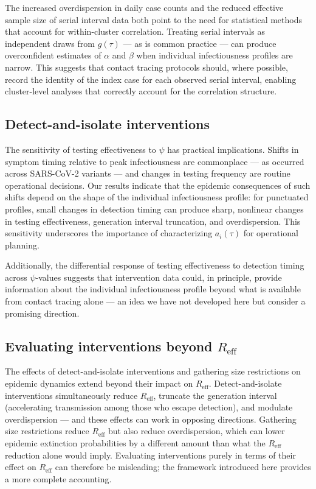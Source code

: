 \documentclass[10pt]{article}
\begin{document}
The increased overdispersion in daily case counts and the reduced effective sample size of serial interval data both point to the need for statistical methods that account for within-cluster correlation. Treating serial intervals as independent draws from $g(\tau)$ --- as is common practice --- can produce overconfident estimates of $\alpha$ and $\beta$ when individual infectiousness profiles are narrow. This suggests that contact tracing protocols should, where possible, record the identity of the index case for each observed serial interval, enabling cluster-level analyses that correctly account for the correlation structure.

\subsection{Detect-and-isolate interventions}

The sensitivity of testing effectiveness to $\psi$ has practical implications. Shifts in symptom timing relative to peak infectiousness are commonplace --- as occurred across SARS-CoV-2 variants --- and changes in testing frequency are routine operational decisions. Our results indicate that the epidemic consequences of such shifts depend on the shape of the individual infectiousness profile: for punctuated profiles, small changes in detection timing can produce sharp, nonlinear changes in testing effectiveness, generation interval truncation, and overdispersion. This sensitivity underscores the importance of characterizing $a_i(\tau)$ for operational planning.

Additionally, the differential response of testing effectiveness to detection timing across $\psi$-values suggests that intervention data could, in principle, provide information about the individual infectiousness profile beyond what is available from contact tracing alone --- an idea we have not developed here but consider a promising direction.

\subsection{Evaluating interventions beyond $R_\text{eff}$}

The effects of detect-and-isolate interventions and gathering size restrictions on epidemic dynamics extend beyond their impact on $R_\text{eff}$. Detect-and-isolate interventions simultaneously reduce $R_\text{eff}$, truncate the generation interval (accelerating transmission among those who escape detection), and modulate overdispersion --- and these effects can work in opposing directions. Gathering size restrictions reduce $R_\text{eff}$ but also reduce overdispersion, which can lower epidemic extinction probabilities by a different amount than what the $R_\text{eff}$ reduction alone would imply. Evaluating interventions purely in terms of their effect on $R_\text{eff}$ can therefore be misleading; the framework introduced here provides a more complete accounting.
\end{document}
